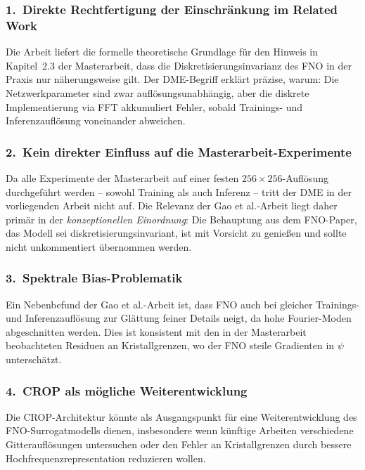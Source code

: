 \documentclass[a4paper,12pt]{article}
\begin{document}
\subsubsection*{1.\ Direkte Rechtfertigung der Einschr\"ankung im Related Work}

Die Arbeit liefert die formelle theoretische Grundlage f\"ur den Hinweis
in Kapitel~2.3 der Masterarbeit, dass die Diskretisierungsinvarianz des FNO
in der Praxis nur n\"aherungsweise gilt. Der DME-Begriff erkl\"art pr\"azise,
warum: Die Netzwerkparameter sind zwar aufl\"osungsunabh\"angig, aber die
diskrete Implementierung via FFT akkumuliert Fehler, sobald Trainings- und
Inferenzaufl\"osung voneinander abweichen.

\subsubsection*{2.\ Kein direkter Einfluss auf die Masterarbeit-Experimente}

Da alle Experimente der Masterarbeit auf einer festen $256 \times 256$-Aufl\"osung
durchgef\"uhrt werden -- sowohl Training als auch Inferenz -- tritt der DME
in der vorliegenden Arbeit nicht auf. Die Relevanz der Gao et al.-Arbeit liegt
daher prim\"ar in der \emph{konzeptionellen Einordnung}: Die Behauptung aus dem
FNO-Paper, das Modell sei diskretisierungsinvariant, ist mit Vorsicht zu
genie\ss en und sollte nicht unkommentiert \"ubernommen werden.

\subsubsection*{3.\ Spektrale Bias-Problematik}

Ein Nebenbefund der Gao et al.-Arbeit ist, dass FNO auch bei gleicher
Trainings- und Inferenzaufl\"osung zur Gl\"attung feiner Details neigt, da
hohe Fourier-Moden abgeschnitten werden. Dies ist konsistent mit den in der
Masterarbeit beobachteten Residuen an Kristallgrenzen, wo der FNO steile
Gradienten in $\psi$ unterschätzt.

\subsubsection*{4.\ CROP als m\"ogliche Weiterentwicklung}

Die CROP-Architektur k\"onnte als Ausgangspunkt f\"ur eine Weiterentwicklung
des FNO-Surrogatmodells dienen, insbesondere wenn k\"unftige Arbeiten
verschiedene Gitteraufl\"osungen untersuchen oder den Fehler an
Kristallgrenzen durch bessere Hochfrequenzrepresentation reduzieren wollen.
\end{document}
